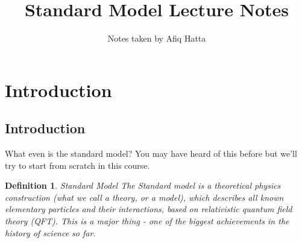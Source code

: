 \documentclass[11pt, oneside]{article}   	%
\title{Standard Model Lecture Notes}
\author{Notes taken by Afiq Hatta}
\theoremstyle{slanted}
\newtheorem*{defn}{Definition}
\begin{document}
 
\maketitle
\tableofcontents

\pagebreak 

\section{Introduction}%
\label{sec:introduction}

\subsection{Introduction} 
What even is the standard model? You may have 
heard of this before but we'll try to start from scratch 
in this course. 

\begin{defn}{Standard Model}
	The Standard model is a theoretical physics construction 
	(what we call a theory, or a model), which describes all 
	known elementary particles and their interactions, based on 
	relativistic quantum field theory (QFT). 
	This is a major thing - one of the biggest achievements 
	in the history of science so far. 
\end{defn}
\end{document}
